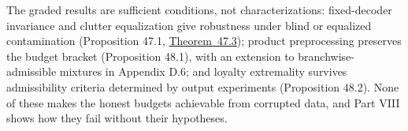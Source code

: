 The graded results are sufficient conditions, not characterizations: fixed-decoder invariance and clutter equalization give robustness under blind or equalized contamination (Proposition 47.1, \hyperlink{stmt:47.3}{Theorem~47.3}); product preprocessing preserves the budget bracket (Proposition 48.1), with an extension to branchwise-admissible mixtures in Appendix D.6; and loyalty extremality survives admissibility criteria determined by output experiments (Proposition 48.2). None of these makes the honest budgets achievable from corrupted data, and Part VIII shows how they fail without their hypotheses.
